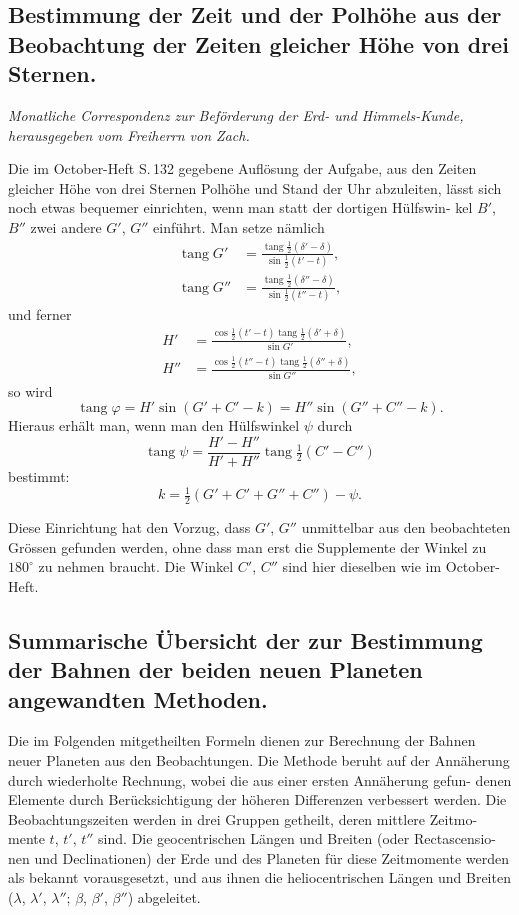\documentclass[12pt,a4paper]{article}
\DeclareMathOperator{\tang}{tang}
\begin{document}
\subsection{Bestimmung der Zeit und der Polhöhe aus der Beobachtung der Zeiten gleicher Höhe von drei Sternen.}

\begin{center}
\textit{Monatliche Correspondenz zur Beförderung der Erd- und Himmels-Kunde,}\\
\textit{herausgegeben vom Freiherrn von Zach.}
\end{center}

Die im October-Heft S.\,132 gegebene Auflösung der Aufgabe, aus den
Zeiten gleicher Höhe von drei Sternen Polhöhe und Stand der Uhr abzuleiten,
lässt sich noch etwas bequemer einrichten, wenn man statt der dortigen Hülfswin-
kel $B'$, $B''$ zwei andere $G'$, $G''$ einführt. Man setze nämlich
\begin{align*}
\tang G' &= \frac{\tang\frac{1}{2}(\delta'-\delta)}{\sin\frac{1}{2}(t'-t)},\\
\tang G'' &= \frac{\tang\frac{1}{2}(\delta''-\delta)}{\sin\frac{1}{2}(t''-t)},
\end{align*}
und ferner
\begin{align*}
H' &= \frac{\cos\frac{1}{2}(t'-t)\tang\frac{1}{2}(\delta'+\delta)}{\sin G'},\\
H'' &= \frac{\cos\frac{1}{2}(t''-t)\tang\frac{1}{2}(\delta''+\delta)}{\sin G''},
\end{align*}
so wird
\[
\tang\varphi = H'\sin(G' + C' - k) = H''\sin(G'' + C'' - k).
\]
Hieraus erhält man, wenn man den Hülfswinkel $\psi$ durch
\[
\tang\psi = \frac{H'-H''}{H'+H''}\tang\tfrac{1}{2}(C'-C'')
\]
bestimmt:
\[
k = \tfrac{1}{2}(G'+C'+G''+C'') - \psi.
\]

Diese Einrichtung hat den Vorzug, dass $G'$, $G''$ unmittelbar aus den
beobachteten Grössen gefunden werden, ohne dass man erst die Supplemente der
Winkel zu $180^{\circ}$ zu nehmen braucht. Die Winkel $C'$, $C''$ sind hier dieselben
wie im October-Heft.

\subsection{Summarische Übersicht der zur Bestimmung der Bahnen der beiden neuen Planeten angewandten Methoden.}

Die im Folgenden mitgetheilten Formeln dienen zur Berechnung der Bahnen
neuer Planeten aus den Beobachtungen. Die Methode beruht auf der Annäherung
 durch wiederholte Rechnung, wobei die aus einer ersten Annäherung gefun-
denen Elemente durch Berücksichtigung der höheren Differenzen verbessert werden.
Die Beobachtungszeiten werden in drei Gruppen getheilt, deren mittlere Zeitmo-
mente $t$, $t'$, $t''$ sind. Die geocentrischen Längen und Breiten (oder Rectascensio-
nen und Declinationen) der Erde und des Planeten für diese Zeitmomente werden
als bekannt vorausgesetzt, und aus ihnen die heliocentrischen Längen und Breiten
($\lambda$, $\lambda'$, $\lambda''$; $\beta$, $\beta'$, $\beta''$) abgeleitet.
\end{document}
